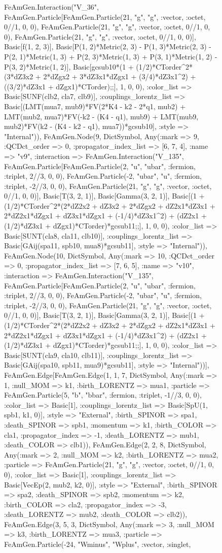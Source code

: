 \documentclass{revtex4}
\begin{document}
\begin{figure}[!htb]
\begin{center}
{FeAmGen.Interaction("V_36", FeAmGen.Particle[FeAmGen.Particle(21, "g", "g", :vector, :octet, 0//1, 0, 0), FeAmGen.Particle(21, "g", "g", :vector, :octet, 0//1, 0, 0), FeAmGen.Particle(21, "g", "g", :vector, :octet, 0//1, 0, 0)], Basic[f(1, 2, 3)], Basic[P(1, 2)*Metric(2, 3) - P(1, 3)*Metric(2, 3) - P(2, 1)*Metric(1, 3) + P(2, 3)*Metric(1, 3) + P(3, 1)*Metric(1, 2) - P(3, 2)*Metric(1, 2)], Basic[gcsub10*(1 + (1/2)*CTorder^2*(3*dZ3x2 + 2*dZgx2 + 3*dZ3x1*dZgx1 + (3/4)*dZ3x1^2) + ((3/2)*dZ3x1 + dZgx1)*CTorder);;], 1, 0, 0), :color_list => Basic[SUNF(clb2, cla7, clb9)], :couplings_lorentz_list => Basic[(LMT(mua7, mub9)*FV(2*K4 - k2 - 2*q1, mub2) + LMT(mub2, mua7)*FV(-k2 - (K4 - q1), mub9) + LMT(mub9, mub2)*FV(k2 - (K4 - k2 - q1), mua7))*gcsub10], :style => "Internal")), FeAmGen.Node(9, Dict{Symbol, Any}(:mark => 9, :QCDct_order => 0, :propagator_index_list => [6, 7, 4], :name => "v9", :interaction => FeAmGen.Interaction("V_135", FeAmGen.Particle[FeAmGen.Particle(2, "u", "ubar", :fermion, :triplet, 2//3, 0, 0), FeAmGen.Particle(-2, "ubar", "u", :fermion, :triplet, -2//3, 0, 0), FeAmGen.Particle(21, "g", "g", :vector, :octet, 0//1, 0, 0)], Basic[T(3, 2, 1)], Basic[Gamma(3, 2, 1)], Basic[(1 + (1/2)*CTorder^2*(2*dZ2x2 + dZ3x2 + 2*dZgx2 + dZ2x1*dZ3x1 + 2*dZ2x1*dZgx1 + dZ3x1*dZgx1 + (-1/4)*dZ3x1^2) + (dZ2x1 + (1/2)*dZ3x1 + dZgx1)*CTorder)*gcsub11;;], 1, 0, 0), :color_list => Basic[SUNT(cla8, cla11, clb10)], :couplings_lorentz_list => Basic[GAij(spa11, spb10, mua8)*gcsub11], :style => "Internal")), FeAmGen.Node(10, Dict{Symbol, Any}(:mark => 10, :QCDct_order => 0, :propagator_index_list => [7, 6, 5], :name => "v10", :interaction => FeAmGen.Interaction("V_135", FeAmGen.Particle[FeAmGen.Particle(2, "u", "ubar", :fermion, :triplet, 2//3, 0, 0), FeAmGen.Particle(-2, "ubar", "u", :fermion, :triplet, -2//3, 0, 0), FeAmGen.Particle(21, "g", "g", :vector, :octet, 0//1, 0, 0)], Basic[T(3, 2, 1)], Basic[Gamma(3, 2, 1)], Basic[(1 + (1/2)*CTorder^2*(2*dZ2x2 + dZ3x2 + 2*dZgx2 + dZ2x1*dZ3x1 + 2*dZ2x1*dZgx1 + dZ3x1*dZgx1 + (-1/4)*dZ3x1^2) + (dZ2x1 + (1/2)*dZ3x1 + dZgx1)*CTorder)*gcsub11;;], 1, 0, 0), :color_list => Basic[SUNT(cla9, cla10, clb11)], :couplings_lorentz_list => Basic[GAij(spa10, spb11, mua9)*gcsub11], :style => "Internal"))], FeAmGen.Edge[FeAmGen.Edge(1, 1, 7, Dict{Symbol, Any}(:mark => 1, :null_MOM => k1, :birth_LORENTZ => mua1, :particle => FeAmGen.Particle(5, "b", "bbar", :fermion, :triplet, -1//3, 0, 0), :color_list => Basic[1], :couplings_lorentz_list => Basic[SpU(1, spb1, k1, 0)], :style => "External", :birth_SPINOR => spa1, :death_SPINOR => spb1, :momentum => k1, :birth_COLOR => cla1, :propagator_index => -1, :death_LORENTZ => mub1, :death_COLOR => clb1)), FeAmGen.Edge(2, 2, 8, Dict{Symbol, Any}(:mark => 2, :null_MOM => k2, :birth_LORENTZ => mua2, :particle => FeAmGen.Particle(21, "g", "g", :vector, :octet, 0//1, 0, 0), :color_list => Basic[1], :couplings_lorentz_list => Basic[VecEp(2, mub2, k2, 0)], :style => "External", :birth_SPINOR => spa2, :death_SPINOR => spb2, :momentum => k2, :birth_COLOR => cla2, :propagator_index => -3, :death_LORENTZ => mub2, :death_COLOR => clb2)), FeAmGen.Edge(3, 5, 3, Dict{Symbol, Any}(:mark => 3, :null_MOM => k3, :birth_LORENTZ => mua3, :particle => FeAmGen.Particle(-24, "Wminus", "Wplus", :vector, :singlet, }
\end{center}
\end{figure}
\end{document}
